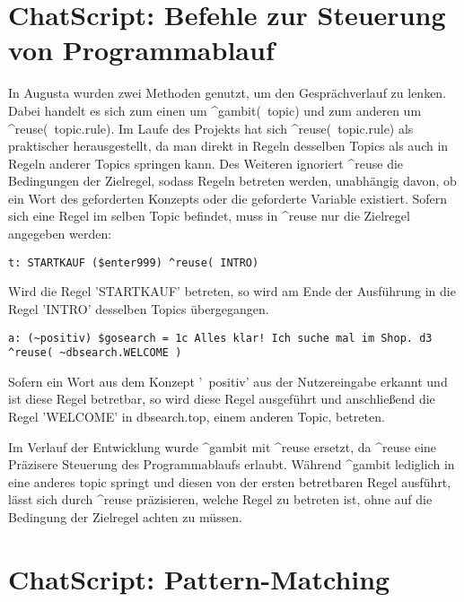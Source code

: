 \section{ChatScript: Befehle zur Steuerung von Programmablauf}
\label{sec:ChatScript: Befehle zur Steuerung von Programmablauf}

In Augusta wurden zwei Methoden genutzt, um den Gesprächverlauf zu lenken. Dabei handelt es sich zum einen um ^gambit(~topic) und zum anderen um ^reuse(~topic.rule). Im Laufe des Projekts hat sich ^reuse(~topic.rule) als praktischer herausgestellt, da man direkt in Regeln desselben Topics als auch in Regeln anderer Topics springen kann. Des Weiteren ignoriert ^reuse die Bedingungen der Zielregel, sodass Regeln betreten werden, unabhängig davon, ob ein Wort des geforderten Konzepts oder die geforderte Variable existiert. Sofern sich eine Regel im selben Topic befindet, muss in ^reuse nur die Zielregel angegeben werden:

\begin{lstlisting}[caption={Regel STARTKAUF in kaufabsicht.top}]
t: STARTKAUF ($enter999) ^reuse( INTRO)
\end{lstlisting}

Wird die Regel 'STARTKAUF' betreten, so wird am Ende der Ausführung in die Regel 'INTRO' desselben Topics übergegangen. 

\begin{lstlisting}[caption={Regel in keyexonesentence.top}]
a: (~positiv) $gosearch = 1c Alles klar! Ich suche mal im Shop. d3 ^reuse( ~dbsearch.WELCOME )
\end{lstlisting}

Sofern ein Wort aus dem Konzept '~positiv' aus der Nutzereingabe erkannt und ist diese Regel betretbar, so wird diese Regel ausgeführt und anschließend die Regel 'WELCOME' in dbsearch.top, einem anderen Topic, betreten.

Im Verlauf der Entwicklung wurde ^gambit mit ^reuse ersetzt, da ^reuse eine Präzisere Steuerung des Programmablaufs erlaubt. Während ^gambit lediglich in eine anderes topic springt und diesen von der ersten betretbaren Regel ausführt, lässt sich durch ^reuse präzisieren, welche Regel zu betreten ist, ohne auf die Bedingung der Zielregel achten zu müssen.  

\section{ChatScript: Pattern-Matching}
\label{sec:ChatScript: Pattern-Matching}



